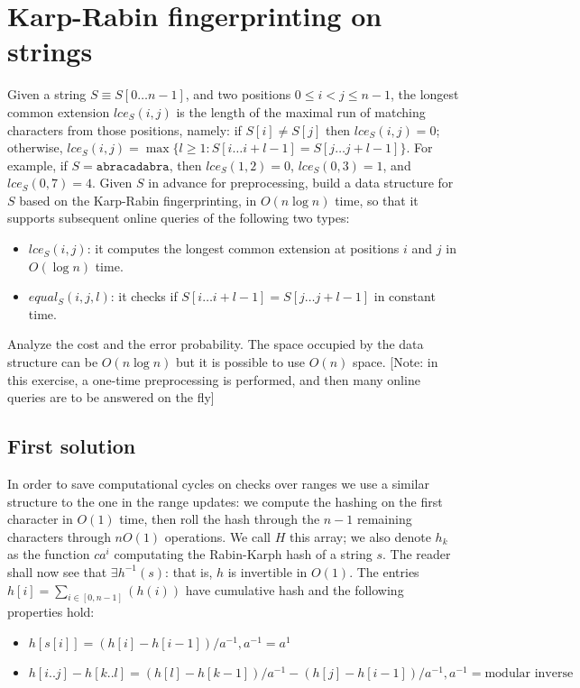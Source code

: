 \section{Karp-Rabin fingerprinting on strings}

Given a string $S \equiv S[0 \dots n - 1]$, and two positions $0 \leq i < j \leq n - 1$, the longest common extension $lce_S(i, j)$ is the length of the maximal run of matching characters from those positions, namely: if $S[i] \neq S[j]$ then $lce_S(i, j) = 0$; otherwise, $lce_S(i, j) = \max\{l \geq 1 : S[i \dots i + l - 1] = S[j \dots j + l - 1]\}$. For example, if $S = \texttt{abracadabra}$, then $lce_S(1, 2) = 0$, $lce_S(0, 3) = 1$, and $lce_S(0, 7) = 4$. Given $S$ in advance for preprocessing, build a data structure for $S$ based on the Karp-Rabin fingerprinting, in $O(n \log n)$ time, so that it supports subsequent online queries of the following two types:
\begin{itemize}
  \item $lce_S(i,j)$: it computes the longest common extension at positions $i$ and $j$ in $O(\log n)$ time.
  \item $equal_S(i,j,l)$: it checks if $S[i \dots i+l-1] = S[j \dots j+l-1]$ in constant time.
\end{itemize}
Analyze the cost and the error probability. The space occupied by the data structure can be $O(n \log n)$ but it is possible to use $O(n)$ space. [Note: in this exercise, a one-time preprocessing is performed, and then many online queries are to be answered on the fly]

\subsection{First solution}

In order to save computational cycles on checks over ranges we use a similar structure
to the one in the range updates: we compute the hashing on the first character in $O(1)$
time, then roll the hash through the $n - 1$ remaining characters through $n O(1)$
operations.
We call $H$ this array; we also denote $h_k$ as the function $c a^{i}$ computating
the Rabin-Karph hash of a string $s$.
The reader shall now see that $\exists h^{-1}(s)$: that is, $h$ is invertible in $O(1)$.
The entries $h[i] = \sum_{i \in [0, n - 1]}(h(i))$ have cumulative hash and the following
properties hold:
    \begin{itemize}
    \item $h[s[i]] = (h[i] - h[i - 1]) / a^{-1}, a^{-1} = a^{1}$
    \item $h[i..j] - h[k..l] = (h[l] - h[k - 1]) / a^{-1} -
            (h[j] - h[i - 1]) / a^{-1}, a^{-1} = \textrm{modular inverse}$
    \end{itemize}

